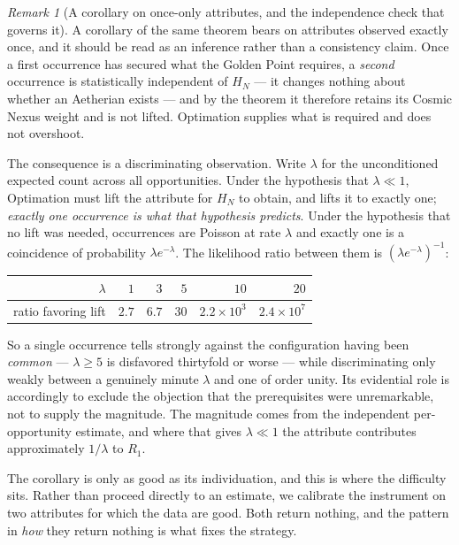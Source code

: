 \documentclass[11pt]{article}
\numberwithin{equation}{section}
\theoremstyle{plain}
\theoremstyle{definition}
\theoremstyle{remark}
\newtheorem{remark}[theorem]{Remark}
\begin{document}
\begin{remark}[A corollary on once-only attributes, and the independence
check that governs it]\label{gc:rem:onceonly}
A corollary of the same theorem bears on attributes observed exactly
once, and it should be read as an inference rather than a
consistency claim. Once a first occurrence has secured what the Golden
Point requires, a \emph{second} occurrence is statistically independent
of $H_N$ --- it changes nothing about whether an Aetherian exists ---
and by the theorem it therefore retains its Cosmic Nexus weight and is
not lifted. Optimation supplies what is required and does not
overshoot.

The consequence is a discriminating observation. Write $\lambda$ for
the unconditioned expected count across all opportunities. Under the
hypothesis that $\lambda\ll1$, Optimation must lift the attribute for
$H_N$ to obtain, and lifts it to exactly one; \emph{exactly one
occurrence is what that hypothesis predicts}. Under the hypothesis that
no lift was needed, occurrences are Poisson at rate $\lambda$ and
exactly one is a coincidence of probability $\lambda e^{-\lambda}$. The
likelihood ratio between them is $\left(\lambda
e^{-\lambda}\right)^{-1}$:
\begin{center}\small
\begin{tabular}{@{}rrrrrr@{}}
\toprule
$\lambda$ & $1$ & $3$ & $5$ & $10$ & $20$\\
\midrule
ratio favoring lift & $2.7$ & $6.7$ & $30$ & $2.2\times10^{3}$ &
$2.4\times10^{7}$\\
\bottomrule
\end{tabular}
\end{center}
So a single occurrence tells strongly against the configuration having
been \emph{common} --- $\lambda\ge5$ is disfavored thirtyfold or worse
--- while discriminating only weakly between a genuinely minute
$\lambda$ and one of order unity. Its evidential role is accordingly to
exclude the objection that the prerequisites were unremarkable, not to
supply the magnitude. The magnitude comes from the independent
per-opportunity estimate, and where that gives $\lambda\ll1$ the
attribute contributes approximately $1/\lambda$ to $R_1$.

The corollary is only as good as its individuation, and this is where
the difficulty sits. Rather than proceed directly to an estimate, we
calibrate the instrument on two attributes for which the data are good.
Both return nothing, and the pattern in \emph{how} they return nothing
is what fixes the strategy.


\end{remark}
\end{document}
